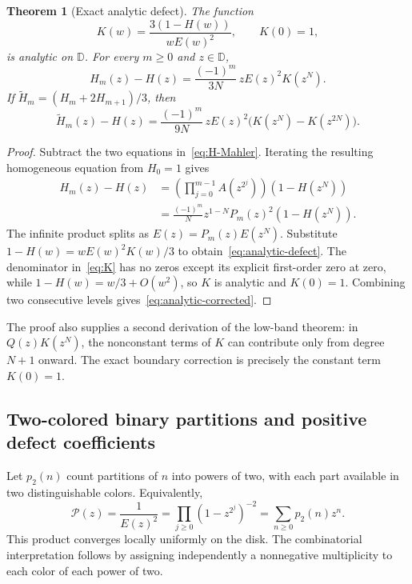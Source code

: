 \documentclass[11pt,a4paper]{article}
\numberwithin{equation}{section}
\newtheorem{theorem}{Theorem}[section]
\theoremstyle{definition}
\theoremstyle{remark}
\newcommand{\D}{\mathbb D}
\newcommand{\Ht}{\widetilde H}
\begin{document}
\begin{theorem}[Exact analytic defect]
\label{thm:analytic}
The function
\begin{equation}
 K(w)=\frac{3(1-H(w))}{wE(w)^2},\qquad K(0)=1,
 \label{eq:K}
\end{equation}
is analytic on $\D$. For every $m\ge0$ and $z\in\D$,
\begin{equation}
 \boxed{\quad H_m(z)-H(z)
 =\frac{(-1)^m}{3N}\,zE(z)^2K(z^N).\quad}
 \label{eq:analytic-defect}
\end{equation}
If $\Ht_m=(H_m+2H_{m+1})/3$, then
\begin{equation}
 \Ht_m(z)-H(z)
 =\frac{(-1)^m}{9N}\,zE(z)^2
       \bigl(K(z^N)-K(z^{2N})\bigr).
 \label{eq:analytic-corrected}
\end{equation}
\end{theorem}
\begin{proof}
Subtract the two equations in~\eqref{eq:H-Mahler}. Iterating the resulting
homogeneous equation from $H_0=1$ gives
\begin{align*}
 H_m(z)-H(z)
 &=\left(\prod_{j=0}^{m-1}A(z^{2^j})\right)(1-H(z^N))\\
 &=\frac{(-1)^m}{N}z^{1-N}P_m(z)^2(1-H(z^N)).
\end{align*}
The infinite product splits as $E(z)=P_m(z)E(z^N)$. Substitute
$1-H(w)=wE(w)^2K(w)/3$ to obtain~\eqref{eq:analytic-defect}.
The denominator in~\eqref{eq:K} has no zeros except its explicit first-order
zero at zero, while $1-H(w)=w/3+O(w^2)$, so $K$ is analytic and $K(0)=1$.
Combining two consecutive levels gives~\eqref{eq:analytic-corrected}.
\end{proof}

The proof also supplies a second derivation of the low-band theorem: in
$Q(z)K(z^N)$, the nonconstant terms of $K$ can contribute only from degree $N+1$
onward. The exact boundary correction is precisely the constant term $K(0)=1$.

\subsection{Two-colored binary partitions and positive defect coefficients}
Let $p_2(n)$ count partitions of $n$ into powers of two, with each part available
in two distinguishable colors. Equivalently,
\begin{equation}
 \mathcal P(z)=\frac1{E(z)^2}
 =\prod_{j\ge0}(1-z^{2^j})^{-2}
 =\sum_{n\ge0}p_2(n)z^n.
 \label{eq:binary-partitions}
\end{equation}
This product converges locally uniformly on the disk. The combinatorial
interpretation follows by assigning independently a nonnegative multiplicity to
each color of each power of two.
\end{document}
